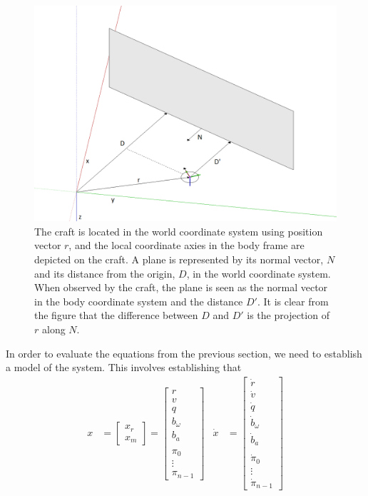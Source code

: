 \documentclass[]{article}
\begin{document}
{\begin{figure}[tb]
	\begin{center}
		\includegraphics[width=\textwidth]{coordinatesystem.png}
	\end{center}
	\caption{The craft is located in the world coordinate system using position vector $r$, and the local coordinate axies in the body frame are depicted on the craft. A plane is represented by its normal vector, $N$ and its distance from the origin, $D$, in the world coordinate system. When observed by the craft, the plane is seen as the normal vector in the body coordinate system and the distance $D'$. It is clear from the figure that the difference between $D$ and $D'$ is the projection of $r$ along $N$.}
	\label{fig:coordinatesystem}
\end{figure}

In order to evaluate the equations from the previous section, we need to establish a model of the system. This involves establishing that 
\begin{align}
	x &=
	\left[
	\begin{matrix}
		x_r \\
		x_m
	\end{matrix}
	\right]
	=
	\left[
	\begin{matrix}
		r \\
		v \\
		q \\
		b_\omega \\
		b_a \\
		\\
		\pi_0 \\
		\vdots \\
		\pi_{n-1}
	\end{matrix}
	\right]
	&
	\dot{x} &= 
	\left[
	\begin{matrix}
		\dot{r} \\
		\dot{v} \\
		\dot{q} \\
		\dot{b}_\omega \\
		\dot{b}_a \\
		\\
		\dot{\pi}_0 \\
		\vdots \\
		\dot{\pi}_{n-1}
	\end{matrix}
	\right]
\end{align}

}
\end{document}
